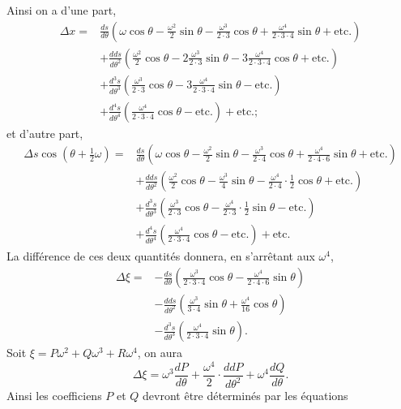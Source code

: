 \documentclass{article}
\begin{document}
Ainsi on a d'une part,
\[ \begin{aligned} \Delta x={}&\frac{ds}{d\theta}\left(\omega\cos\theta-\frac{\omega^{2}}{2}\sin\theta-\frac{\omega^{3}}{2\cdot3}\cos\theta+\frac{\omega^{4}}{2\cdot3\cdot4}\sin\theta+\text{etc.}\right)\\ &+\frac{dds}{d\theta^{2}}\left(\frac{\omega^{2}}{2}\cos\theta-2\frac{\omega^{3}}{2\cdot3}\sin\theta-3\frac{\omega^{4}}{2\cdot3\cdot4}\cos\theta+\text{etc.}\right)\\ &+\frac{d^{3}s}{d\theta^{3}}\left(\frac{\omega^{3}}{2\cdot3}\cos\theta-3\frac{\omega^{4}}{2\cdot3\cdot4}\sin\theta-\text{etc.}\right)\\ &+\frac{d^{4}s}{d\theta^{4}}\left(\frac{\omega^{4}}{2\cdot3\cdot4}\cos\theta-\text{etc.}\right)+\text{etc.}; \end{aligned} \]
et d'autre part,
\[ \begin{aligned} \Delta s\cos(\theta+\tfrac{1}{2}\omega)={}&\frac{ds}{d\theta}\left(\omega\cos\theta-\frac{\omega^{2}}{2}\sin\theta-\frac{\omega^{3}}{2\cdot4}\cos\theta+\frac{\omega^{4}}{2\cdot4\cdot6}\sin\theta+\text{etc.}\right)\\ &+\frac{dds}{d\theta^{2}}\left(\frac{\omega^{2}}{2}\cos\theta-\frac{\omega^{3}}{4}\sin\theta-\frac{\omega^{4}}{2\cdot4}\cdot\frac{1}{2}\cos\theta+\text{etc.}\right)\\ &+\frac{d^{3}s}{d\theta^{3}}\left(\frac{\omega^{3}}{2\cdot3}\cos\theta-\frac{\omega^{4}}{2\cdot3}\cdot\frac{1}{2}\sin\theta-\text{etc.}\right)\\ &+\frac{d^{4}s}{d\theta^{4}}\left(\frac{\omega^{4}}{2\cdot3\cdot4}\cos\theta-\text{etc.}\right)+\text{etc.} \end{aligned} \]
La différence de ces deux quantités donnera, en s'arrêtant aux $\omega^{4}$,
\[ \begin{aligned} \Delta\xi={}&-\frac{ds}{d\theta}\left(\frac{\omega^{3}}{2\cdot3\cdot4}\cos\theta-\frac{\omega^{4}}{2\cdot4\cdot6}\sin\theta\right)\\ &-\frac{dds}{d\theta^{2}}\left(\frac{\omega^{3}}{3\cdot4}\sin\theta+\frac{\omega^{4}}{16}\cos\theta\right)\\ &-\frac{d^{3}s}{d\theta^{3}}\left(\frac{\omega^{4}}{2\cdot3\cdot4}\sin\theta\right). \end{aligned} \]
Soit $\xi=P\omega^{2}+Q\omega^{3}+R\omega^{4}$, on aura
\[ \Delta\xi=\omega^{3}\frac{dP}{d\theta}+\frac{\omega^{4}}{2}\cdot\frac{ddP}{d\theta^{2}}+\omega^{4}\frac{dQ}{d\theta}. \]
Ainsi les coefficiens $P$ et $Q$ devront être déterminés par les équations
\end{document}
